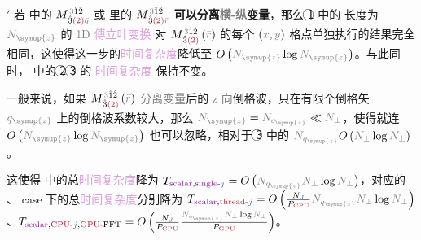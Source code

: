{\two}$'$ 若  中的 ${M}^{\;\! \mathcolor{gray}{3} \hat{1} \hat{2} }_{\;\! \hat{3} \textcolor{Maroon}{(2)} \mathcolor{gray}{\bar{q}} }$ 或  里的 ${M}^{\;\! \mathcolor{gray}{3} \hat{1} \hat{2} }_{\;\! \hat{3} \textcolor{Maroon}{(2)} \mathcolor{gray}{\bar{r}} }$ \textbf{可以分离\textcolor{gray}{横-纵}变量}，那么 {\two} \textcircled{1} 中的 长度为 $\textcolor{gray}{N_{\symup{z}}}$ 的 \textcolor{gray}{1D} \textcolor{Plum}{傅立叶变换}  对 ${M}^{\;\! \mathcolor{gray}{3} \hat{1} \hat{2} }_{\;\! \hat{3} \textcolor{Maroon}{(2)} } \left( \mathcolor{gray}{\bar{r}} \right)$ 的每个 $\left( \textcolor{gray}{x}, \textcolor{gray}{y} \right)$ 格点单独执行的结果完全相同，这使得这一步的\textcolor{Plum}{时间复杂度}降低至 $O \left( \textcolor{gray}{N_{\symup{z}}} \log \textcolor{gray}{N_{\symup{z}}} \right)$。与此同时，{\two} 中的 \textcircled{2} \textcircled{3} 的 \textcolor{Plum}{时间复杂度} 保持不变。

一般来说，如果 ${M}^{\;\! \mathcolor{gray}{3} \hat{1} \hat{2} }_{\;\! \hat{3} \textcolor{Maroon}{(2)} } \left( \mathcolor{gray}{\bar{r}} \right)$ \textcolor{gray}{分离变量}后的 \textcolor{gray}{z 向}\textcolor{NavyBlue}{倒格波}，只在有限个\textcolor{NavyBlue}{倒格矢} $\mathcolor{gray}{q_{\symup{z}}}$ 上的\textcolor{NavyBlue}{倒格波}系数较大，那么 $\textcolor{gray}{N_{\symup{z}}} = \textcolor{gray}{N_{q_{\symup{z}}}} \ll \textcolor{gray}{N_\perp}$，使得就连 $O \left( \textcolor{gray}{N_{\symup{z}}} \log \textcolor{gray}{N_{\symup{z}}} \right)$ 也可以忽略，相对于 {\two} \textcircled{3} 中的 $\textcolor{gray}{N_{q_{\symup{z}}}} O \left( \textcolor{gray}{N_\perp} \log \textcolor{gray}{N_\perp} \right)$。

这使得 {\three} 中的总\textcolor{Plum}{时间复杂度}降为 $T_{\text{\textcolor{Plum}{scalar}},\text{\textcolor{Plum}{single-}}\textcolor{NavyBlue}{j}} = O \left( \textcolor{gray}{N_{q_{\symup{z}}}} \textcolor{gray}{N_\perp} \log \textcolor{gray}{N_\perp} \right)$，对应的 {\four}、{\five} case 下的总\textcolor{Plum}{时间复杂度}分别降为 $T_{\text{\textcolor{Plum}{scalar}},\text{\textcolor{Maroon}{thread-}}\textcolor{NavyBlue}{j}} = O \left( \frac{N_{\textcolor{NavyBlue}{J}}}{P_{\text{\textcolor{Maroon}{CPU}}}} \textcolor{gray}{N_{q_{\symup{z}}}} \textcolor{gray}{N_\perp} \log \textcolor{gray}{N_\perp} \right)$、$T_{\text{\textcolor{Plum}{scalar}},\text{\textcolor{Maroon}{CPU-}}\textcolor{NavyBlue}{j},\text{\textcolor{Maroon}{GPU-}}\text{FFT}} = O \left( \frac{N_{\textcolor{NavyBlue}{J}}}{P_{\text{\textcolor{Maroon}{CPU}}}} \frac{\textcolor{gray}{N_{q_{\symup{z}}}} \textcolor{gray}{N_\perp} \log \textcolor{gray}{N_\perp}}{P_{\text{\textcolor{Maroon}{GPU}}}} \right)$。

